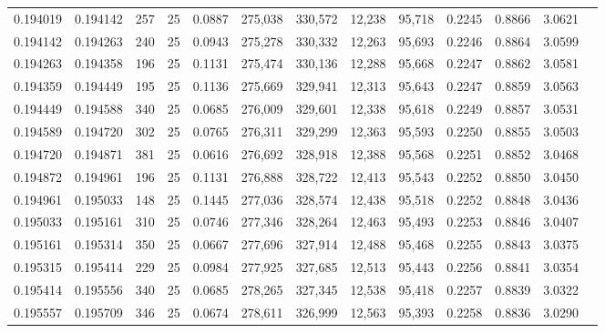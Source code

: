 \begin{tabular}{rrrrrrrrrrrrr}
0.194019 & 0.194142 &   257 &  25 &                                     0.0887 & 275,038 & 330,572 &  12,238 &  95,718 & 0.2245 & 0.8866 & 3.0621 \\
0.194142 & 0.194263 &   240 &  25 &                                     0.0943 & 275,278 & 330,332 &  12,263 &  95,693 & 0.2246 & 0.8864 & 3.0599 \\
0.194263 & 0.194358 &   196 &  25 &                                     0.1131 & 275,474 & 330,136 &  12,288 &  95,668 & 0.2247 & 0.8862 & 3.0581 \\
0.194359 & 0.194449 &   195 &  25 &                                     0.1136 & 275,669 & 329,941 &  12,313 &  95,643 & 0.2247 & 0.8859 & 3.0563 \\
0.194449 & 0.194588 &   340 &  25 &                                     0.0685 & 276,009 & 329,601 &  12,338 &  95,618 & 0.2249 & 0.8857 & 3.0531 \\
0.194589 & 0.194720 &   302 &  25 &                                     0.0765 & 276,311 & 329,299 &  12,363 &  95,593 & 0.2250 & 0.8855 & 3.0503 \\
0.194720 & 0.194871 &   381 &  25 &                                     0.0616 & 276,692 & 328,918 &  12,388 &  95,568 & 0.2251 & 0.8852 & 3.0468 \\
0.194872 & 0.194961 &   196 &  25 &                                     0.1131 & 276,888 & 328,722 &  12,413 &  95,543 & 0.2252 & 0.8850 & 3.0450 \\
0.194961 & 0.195033 &   148 &  25 &                                     0.1445 & 277,036 & 328,574 &  12,438 &  95,518 & 0.2252 & 0.8848 & 3.0436 \\
0.195033 & 0.195161 &   310 &  25 &                                     0.0746 & 277,346 & 328,264 &  12,463 &  95,493 & 0.2253 & 0.8846 & 3.0407 \\
0.195161 & 0.195314 &   350 &  25 &                                     0.0667 & 277,696 & 327,914 &  12,488 &  95,468 & 0.2255 & 0.8843 & 3.0375 \\
0.195315 & 0.195414 &   229 &  25 &                                     0.0984 & 277,925 & 327,685 &  12,513 &  95,443 & 0.2256 & 0.8841 & 3.0354 \\
0.195414 & 0.195556 &   340 &  25 &                                     0.0685 & 278,265 & 327,345 &  12,538 &  95,418 & 0.2257 & 0.8839 & 3.0322 \\
0.195557 & 0.195709 &   346 &  25 &                                     0.0674 & 278,611 & 326,999 &  12,563 &  95,393 & 0.2258 & 0.8836 & 3.0290 \\

\end{tabular}

